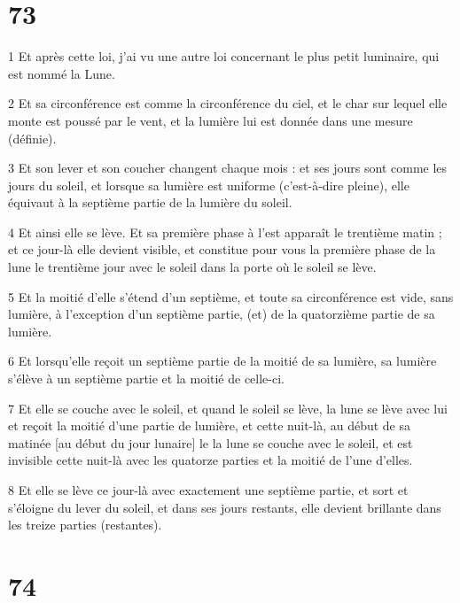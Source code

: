 \chapter{73}

\par 1 Et après cette loi, j'ai vu une autre loi concernant le plus petit luminaire, qui est nommé la Lune.
\par 2 Et sa circonférence est comme la circonférence du ciel, et le char sur lequel elle monte est poussé par le vent, et la lumière lui est donnée dans une mesure (définie).
\par 3 Et son lever et son coucher changent chaque mois : et ses jours sont comme les jours du soleil, et lorsque sa lumière est uniforme (c'est-à-dire pleine), elle équivaut à la septième partie de la lumière du soleil.
\par 4 Et ainsi elle se lève. Et sa première phase à l'est apparaît le trentième matin ; et ce jour-là elle devient visible, et constitue pour vous la première phase de la lune le trentième jour avec le soleil dans la porte où le soleil se lève.
\par 5 Et la moitié d'elle s'étend d'un septième, et toute sa circonférence est vide, sans lumière, à l'exception d'un septième partie, (et) de la quatorzième partie de sa lumière.
\par 6 Et lorsqu'elle reçoit un septième partie de la moitié de sa lumière, sa lumière s'élève à un septième partie et la moitié de celle-ci.
\par 7 Et elle se couche avec le soleil, et quand le soleil se lève, la lune se lève avec lui et reçoit la moitié d'une partie de lumière, et cette nuit-là, au début de sa matinée [au début du jour lunaire] le la lune se couche avec le soleil, et est invisible cette nuit-là avec les quatorze parties et la moitié de l'une d'elles.
\par 8 Et elle se lève ce jour-là avec exactement une septième partie, et sort et s'éloigne du lever du soleil, et dans ses jours restants, elle devient brillante dans les treize parties (restantes).

\chapter{74}

